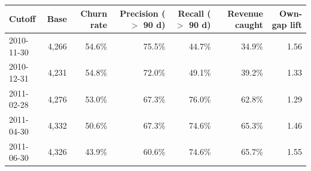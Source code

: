 \begin{tabular}{lrrrrrr}
\toprule
Cutoff & Base & Churn rate & Precision ($>$ 90 d) & Recall ($>$ 90 d) & Revenue caught & Own-gap lift \\
\midrule
2010-11-30 & 4,266 & 54.6\% & 75.5\% & 44.7\% & 34.9\% & 1.56 \\
2010-12-31 & 4,231 & 54.8\% & 72.0\% & 49.1\% & 39.2\% & 1.33 \\
2011-02-28 & 4,276 & 53.0\% & 67.3\% & 76.0\% & 62.8\% & 1.29 \\
2011-04-30 & 4,332 & 50.6\% & 67.3\% & 74.6\% & 65.3\% & 1.46 \\
2011-06-30 & 4,326 & 43.9\% & 60.6\% & 74.6\% & 65.7\% & 1.55 \\
\bottomrule
\end{tabular}

